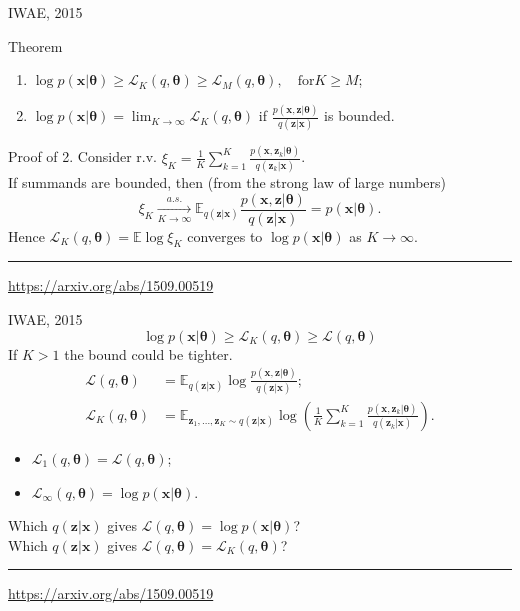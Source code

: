 \documentclass{beamer}
\newcommand{\bx}{\mathbf{x}}
\newcommand{\bz}{\mathbf{z}}
\newcommand{\btheta}{\boldsymbol{\theta}}
\begin{document}
\begin{frame}{IWAE, 2015}
\begin{block}{Theorem}
	\begin{enumerate}
		\item $\log p(\bx | \btheta) \geq \mathcal{L}_K (q, \btheta) \geq \mathcal{L}_M (q, \btheta), \quad \text{for} K \geq M$;
		\item $\log p(\bx | \btheta) = \lim_{K \rightarrow \infty} \mathcal{L}_K (q, \btheta)$ if $\frac{p(\bx, \bz | \btheta)}{q(\bz | \bx)}$ is bounded.
	\end{enumerate}
	\vspace{-0.2cm}
\end{block}
\begin{block}{Proof of 2.}
	\vspace{0.2cm}
	Consider r.v. $\xi_K = \frac{1}{K}\sum_{k=1}^K \frac{p(\bx, \bz_k | \btheta)}{q(\bz_k | \bx)}$. \\
	\vspace{0.2cm}
	If summands are bounded, then (from the strong law of large numbers)
	\[
	\xi_K \xrightarrow[K \rightarrow \infty]{a.s.} \mathbb{E}_{q(\bz | \bx)} \frac{p(\bx, \bz | \btheta)}{q(\bz | \bx)} = p(\bx | \btheta).
	\]
	Hence $\mathcal{L}_K (q, \btheta) = \mathbb{E} \log \xi_K$ converges to $\log p(\bx | \btheta)$ as $K \rightarrow \infty$.
\end{block}
\vfill
\hrule\medskip
{\scriptsize \href{https://arxiv.org/abs/1509.00519}{https://arxiv.org/abs/1509.00519}}
\end{frame}
\begin{frame}{IWAE, 2015}
\[
\log p(\bx | \btheta) \geq \mathcal{L}_K(q, \btheta) \geq \mathcal{L}(q, \btheta)
\]
If $K > 1$ the bound could be tighter.
\begin{align*}
	\mathcal{L} (q, \btheta) &= \mathbb{E}_{q(\bz | \bx)} \log \frac{p(\bx, \bz | \btheta)}{q(\bz| \bx)}; \\
	\mathcal{L}_K (q, \btheta) &= \mathbb{E}_{\bz_1, \dots, \bz_K \sim q(\bz | \bx)} \log \left( \frac{1}{K}\sum_{k=1}^K\frac{p(\bx, \bz_k | \btheta)}{q(\bz_k| \bx)} \right).
\end{align*}
\vspace{-0.2cm}
\begin{itemize}
	\item $\mathcal{L}_1(q, \btheta) = \mathcal{L}(q, \btheta)$;
	\item $\mathcal{L}_{\infty}(q, \btheta) = \log p(\bx | \btheta)$.
\end{itemize}
\vspace{0.2cm}
Which $q(\bz | \bx)$ gives $\mathcal{L}(q, \btheta) = \log p(\bx | \btheta)$? \\
\vspace{0.2cm}
Which $q(\bz | \bx)$ gives $\mathcal{L}(q, \btheta) = \mathcal{L}_K(q, \btheta)$?
\vfill
\hrule\medskip
{\scriptsize \href{https://arxiv.org/abs/1509.00519}{https://arxiv.org/abs/1509.00519}}
\end{frame}
\end{document}
